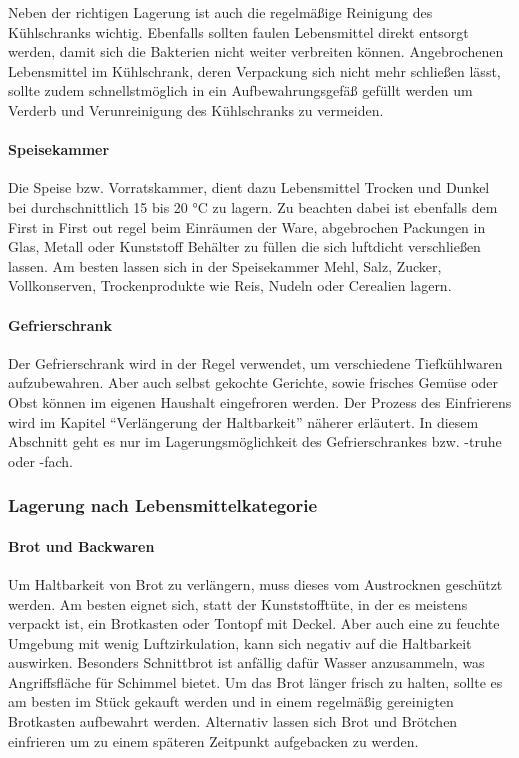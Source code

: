 Neben der richtigen Lagerung ist auch die regelmäßige Reinigung des Kühlschranks wichtig. Ebenfalls sollten faulen Lebensmittel direkt entsorgt werden, damit sich die Bakterien nicht weiter verbreiten können. Angebrochenen Lebensmittel im Kühlschrank, deren Verpackung sich nicht mehr schließen lässt, sollte zudem schnellstmöglich in ein Aufbewahrungsgefäß gefüllt werden um Verderb und Verunreinigung des Kühlschranks zu vermeiden. %
\paragraph{Speisekammer}
Die Speise bzw. Vorratskammer, dient dazu Lebensmittel Trocken und Dunkel bei durchschnittlich 15 bis 20 °C zu lagern. Zu beachten dabei ist ebenfalls dem First in First out regel beim Einräumen der Ware, abgebrochen Packungen in Glas, Metall oder Kunststoff Behälter zu füllen die sich luftdicht verschließen lassen. Am besten lassen sich in der Speisekammer Mehl, Salz, Zucker, Vollkonserven, Trockenprodukte wie Reis, Nudeln oder Cerealien lagern. %

\paragraph{Gefrierschrank}
Der Gefrierschrank wird in der Regel verwendet, um verschiedene Tiefkühlwaren aufzubewahren. Aber auch selbst gekochte Gerichte, sowie frisches Gemüse oder Obst können im eigenen Haushalt eingefroren werden.
Der Prozess des Einfrierens wird im Kapitel “Verlängerung der Haltbarkeit” näherer erläutert. In diesem Abschnitt geht es nur im Lagerungsmöglichkeit des Gefrierschrankes bzw. -truhe oder -fach. %


\subsubsection{Lagerung nach Lebensmittelkategorie}
\paragraph{Brot und Backwaren}
Um Haltbarkeit von Brot zu verlängern, muss dieses vom Austrocknen geschützt werden. Am besten eignet sich, statt der Kunststofftüte, in der es meistens verpackt ist, ein Brotkasten oder Tontopf mit Deckel. Aber auch eine zu feuchte Umgebung mit wenig Luftzirkulation, kann sich negativ auf die Haltbarkeit auswirken. Besonders Schnittbrot ist anfällig dafür Wasser anzusammeln, was Angriffsfläche für Schimmel bietet. Um das Brot länger frisch zu halten, sollte es am besten im Stück gekauft werden und in einem regelmäßig gereinigten Brotkasten aufbewahrt werden. Alternativ lassen sich Brot und Brötchen einfrieren um zu einem späteren Zeitpunkt aufgebacken zu werden. %

